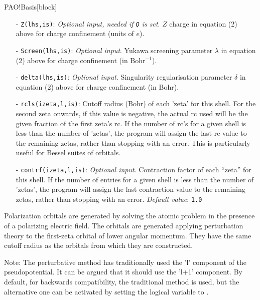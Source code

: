 \begin{fdfentry}{PAO!Basis}[block]
\begin{itemize}
    \item[-]%
    \texttt{Z(lhs,is)}: \textit{Optional input, needed if \texttt{Q}
        is set}. $Z$ charge in equation (2) above for charge
    confinement (units of $e$).

    \item[-]%
    \texttt{Screen(lhs,is)}: \textit{Optional input}. Yukawa screening
    parameter $\lambda$ in equation (2) above for charge confinement
    (in Bohr$^{-1}$).

    \item[-]%
    \texttt{delta(lhs,is)}: \textit{Optional input}. Singularity
    regularisation parameter $\delta$ in equation (2) above for charge
    confinement (in Bohr).

    \item[-]%
    \texttt{rcls(izeta,l,is)}: Cutoff radius (Bohr) of each 'zeta' for
    this shell. For the second zeta onwards, if this value is
    negative, the actual rc used will be the given fraction of the
    first zeta's rc.
    If the number of rc's for a given shell is less than the number of
    'zetas', the program will assign the last rc value to the remaining
    zetas, rather than stopping with an error. This is particularly
    useful for Bessel suites of orbitals.

    \item[-]%
    \texttt{contrf(izeta,l,is)}: \textit{Optional input}.  Contraction
    factor of each ``zeta'' for this shell.   
    If the number of entries for a given shell is less than the number of
    'zetas', the program will assign the last contraction value to the remaining
    zetas, rather than stopping with an error.
    \textit{Default value}: \texttt{1.0}
\end{itemize}

Polarization orbitals are generated by solving
the atomic problem in the presence of a polarizing electric field. The
orbitals are generated applying perturbation theory to the first-zeta
orbital of lower angular momentum.  They have the same cutoff radius
as the orbitals from which they are constructed.

Note: The perturbative method has traditionally used the 'l' component
of the pseudopotential. It can be argued that it should use the 'l+1'
component. By default, for backwards compatibility, the traditional
method is used, but the alternative one can be activated by setting
the logical  variable to \fdffalse.


\end{fdfentry}
